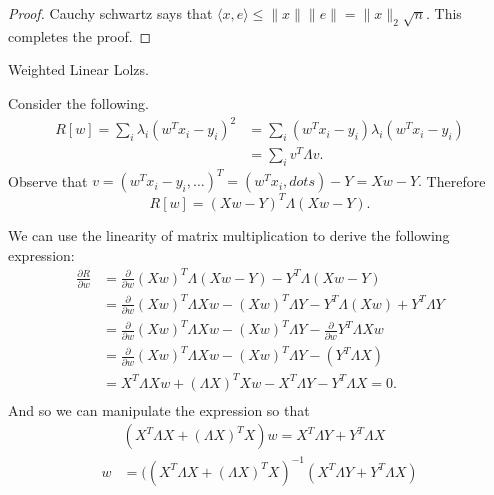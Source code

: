 \documentclass[letter]{article}
\newenvironment{menumerate}{%
  \edef\backupindent{\the\parindent}%
  \enumerate%
  \setlength{\parindent}{\backupindent}%
}{\endenumerate}
\begin{document}
\begin{menumerate}
\begin{menumerate}
\begin{proof}
            Cauchy schwartz says that $\langle x, e \rangle \leq \|x\|\|e\| = \|x\|_2\sqrt{n}.$
            This completes the proof.
       \end{proof}
  \end{menumerate}
  \newpage
  \item Weighted Linear Lolzs.
  \begin{menumerate}
    \item Consider the following.
    \begin{equation}
        \begin{aligned}
          R[w] = \sum_i \lambda_i (w^T x_i - y_i)^2 &=\sum_i (w^T x_i - y_i) \lambda_i (w^T x_i - y_i)  \\
          &=\sum_i v^T \Lambda v. 
        \end{aligned}
    \end{equation}
    Observe that $v = (w^Tx_i - y_i, \dots)^T = (w^Tx_i,dots) - Y = Xw - Y.$ Therefore 
    \begin{equation}
      R[w] = (Xw - Y)^T\Lambda (Xw - Y).
    \end{equation}
    \item We can use the linearity of matrix multiplication to derive the following expression:
    \begin{equation}
      \begin{aligned}
        \frac{\partial R}{\partial w} &= \frac{\partial}{\partial w} (Xw)^T\Lambda (Xw - Y) - Y^T\Lambda (Xw - Y) \\
         &= \frac{\partial}{\partial w} (Xw)^T\Lambda Xw - (Xw)^T\Lambda Y - Y^T\Lambda (Xw) + Y^T \Lambda Y \\
         &= \frac{\partial}{\partial w} (Xw)^T\Lambda Xw - (Xw)^T\Lambda Y- \frac{\partial}{\partial w}  Y^T\Lambda Xw \\
         &= \frac{\partial}{\partial w} (Xw)^T\Lambda Xw - (Xw)^T\Lambda Y - (Y^T\Lambda X) \\
         &= X^T \Lambda Xw + (\Lambda X)^T Xw - X^T \Lambda Y  - Y^T\Lambda X = 0. \\
      \end{aligned}
    \end{equation}
    And so we can manipulate the expression so that
    \begin{equation}
      \begin{aligned}
          &(X^T \Lambda X + (\Lambda X)^T X)w  =  X^T \Lambda Y  + Y^T\Lambda X \\
          w  &=  ((X^T \Lambda X + (\Lambda X)^T X)^{-1}(X^T \Lambda Y  + Y^T\Lambda X) \\

\end{aligned}
\end{equation}
\end{menumerate}
\end{menumerate}
\end{document}
